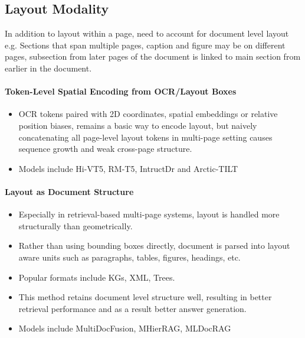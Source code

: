 \documentclass[11pt]{article}
\begin{document}
\subsection{Layout Modality}
In addition to layout within a page, need to account for document level layout e.g. Sections that span multiple pages, caption and figure may be on different pages, subsection from later pages of the document is linked to main section from earlier in the document.

\paragraph{Token-Level Spatial Encoding from OCR/Layout Boxes}
\begin{itemize}
    \item OCR tokens paired with 2D coordinates, spatial embeddings or relative position biases, remains a basic way to encode layout, but naively concatenating all page-level layout tokens in multi-page setting causes sequence growth and weak cross-page structure.
    \item Models include Hi-VT5, RM-T5, IntructDr and Arctic-TILT
\end{itemize}

\paragraph{Layout as Document Structure}
\begin{itemize}
    \item Especially in retrieval-based multi-page systems, layout is handled more structurally than geometrically.
    \item Rather than using bounding boxes directly, document is parsed into layout aware units such as paragraphs, tables, figures, headings, etc.
    \item Popular formats include KGs, XML, Trees. 
    \item This method retains document level structure well, resulting in better retrieval performance and as a result better answer generation.
    \item Models include MultiDocFusion, MHierRAG, MLDocRAG
\end{itemize}
\end{document}
